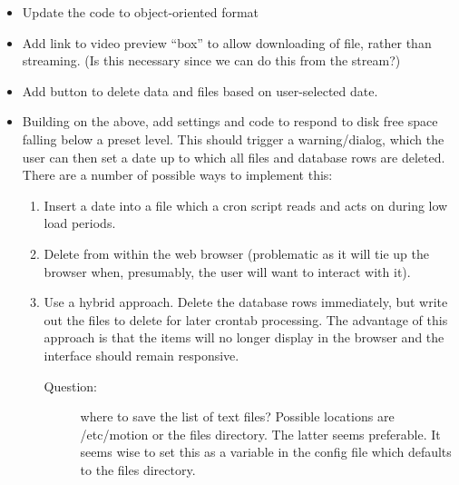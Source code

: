 \documentclass[12pt]{scrartcl} %
\begin{document}
	\begin{itemize}
		\item Update the code to object-oriented format

		\item Add link to video preview \enquote{box} to allow downloading of file, rather
		than streaming. (Is this necessary since we can do this from the stream?)

		\item Add button to delete data and files based on user-selected date.

		\item Building on the above, add settings and code to respond to disk free space falling below a preset level.
		This should trigger a warning/dialog, which the user can then set a date up to which
		all files and database rows are deleted. There are a number of possible ways to implement this:
		\begin{enumerate}
			\item Insert a date into a file which a cron script reads
			and acts on during low load periods.
			\item Delete from within the web browser
			(problematic as it will tie up the browser when, presumably,
			the user will want to interact with it).
			\item Use a hybrid approach. Delete the database rows immediately, but write out the files to delete for later crontab processing. The advantage of this approach is that the items will no longer display in the browser and the interface should remain responsive.
			\begin{description}
				\item [Question:] where to save the list of text files? Possible locations are /etc/motion or the files directory. The latter seems preferable. It seems wise to set this as a variable in the config file which defaults to the files directory.
			\end{description}
		\end{enumerate}

	\end{itemize}
\end{document}
